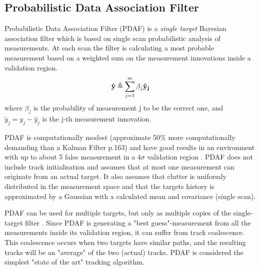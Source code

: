\subsection{Probabilistic Data Association Filter}
Probabilistic Data Association Filter (PDAF) is a \emph{single target} Bayesian association filter which is based on single scan probabilistic analysis of measurements. At each scan the filter is calculating a most probable measurement based on a weighted sum on the measurement innovations inside a validation region.
\begin{equation}
\boldsymbol{\mathbf{\hat{y}}} \triangleq \sum\limits_{j=1}^m \beta_j \boldsymbol{\mathbf{ \tilde{y}_j }}
\label{PDA_sum}
\end{equation}
where $\beta_j$ is the probability of measurement j to be the correct one, and $ \tilde{y}_j = y_j - \hat{y}_j $ is the j-th measurement innovation. 

PDAF is computationally modest (approximate 50\% more computationally demanding than a Kalman Filter \cite{Bar-Shalom1988} p.163) and have good results in an environment with up to about 5 false measurement in a $4\sigma$ validation region \cite{Bar-Shalom1988}. PDAF does not include track initialisation and assumes that at most one measurement can originate from an actual target. It also assumes that clutter is uniformly distributed in the measurement space and that the targets history is approximated by a Gaussian with a calculated mean and covariance (single scan).

PDAF can be used for multiple targets, but only as multiple copies of the single-target filter \cite{Fortmann1983}. Since PDAF is generating a "best guess"-measurement from all the measurements inside its validation region, it can suffer from track coalescence. This coalescence occurs when two targets have similar paths, and the resulting tracks will be an "average" of the two (actual) tracks.
PDAF is considered the simplest "state of the art" tracking algorithm.%


